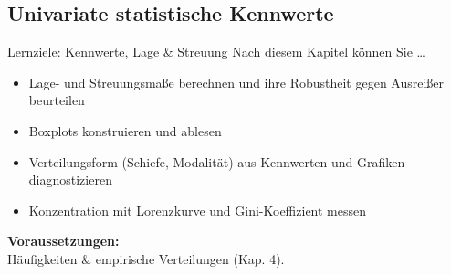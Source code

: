 \documentclass[
  10pt,
  ignorenonframetext,
]{beamer}
\providecommand{\tightlist}{%
  \setlength{\itemsep}{0pt}\setlength{\parskip}{0pt}}
\begin{document}
\hypertarget{univariate-statistische-kennwerte}{%
\subsection{Univariate statistische
Kennwerte}\label{univariate-statistische-kennwerte}}

\begin{frame}{Lernziele: Kennwerte, Lage \& Streuung}
\protect\hypertarget{lernziele-kennwerte-lage-streuung}{}
Nach diesem Kapitel können Sie \ldots{}

\begin{itemize}
\tightlist
\item
  Lage- und Streuungsmaße berechnen und ihre Robustheit gegen Ausreißer
  beurteilen
\item
  Boxplots konstruieren und ablesen
\item
  Verteilungsform (Schiefe, Modalität) aus Kennwerten und Grafiken
  diagnostizieren
\item
  Konzentration mit Lorenzkurve und Gini-Koeffizient messen
\end{itemize}

\vspace{1em}

\textbf{Voraussetzungen:}\\
Häufigkeiten \& empirische Verteilungen (Kap. 4).
\end{frame}

\end{document}
